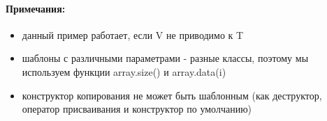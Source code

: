 \paragraph{Примечания:}

\begin{itemize}
\item данный пример работает, если V не приводимо к T

\item шаблоны с различными параметрами - разные классы, поэтому мы используем функции array.size() и array.data(i)

\item конструктор копирования не может быть шаблонным (как деструктор, оператор присваивания и конструктор по умолчанию)
\end{itemize}
